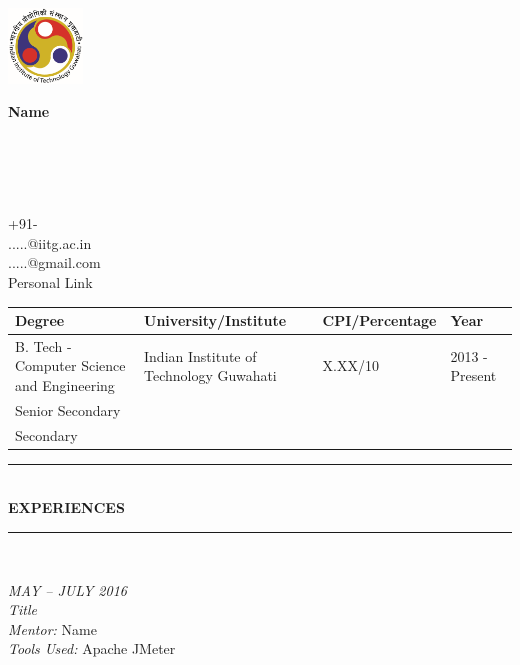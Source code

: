 \documentclass[a4paper,8pt]{article}
\newcommand{\resheading}[1]{

\begin{center}
\rule{\textwidth}{1pt}\vspace{-3pt}\\
	\textsc{{\textbf{#1}}}\vspace{-8pt}\\
\rule{\textwidth}{1pt}\\
\end{center}
\vspace{-5pt}
}
\begin{document}
\begin{minipage}{.1\textwidth}
\hspace*{-0.2in}
 \includegraphics[width=2cm,height=2cm]{iitglogo.png}
\end{minipage}
\begin{minipage}{.55\textwidth}

\textbf  {\large{Name}} \\
\\
\\
\\
\\
\end{minipage}
\hfill
\begin{minipage}{.30\textwidth}
\begin{flushright}
{+91-}\\
{.....@iitg.ac.in}\\
{.....@gmail.com} \\
{Personal Link}
\end{flushright}
\end{minipage}

\begin{center}
	\begin{tabular*}{\textwidth}{p{5cm}@{\hskip 0.2in} l@{\hskip 0.2in} l@{\hskip 0.2in} l@{\hskip 0.2in}}
		\hline
		\textbf{Degree} & \textbf{University/Institute} & \textbf{CPI/Percentage} & \textbf{Year}\vspace{0.5pt}\\
		\hline
		B. Tech - Computer Science and Engineering& Indian Institute of Technology Guwahati & X.XX/10 & 2013 - Present\\
		Senior Secondary &  &  & \\
		Secondary &  &  & \\
		
	\end{tabular*}
\end{center}

\resheading{\textbf{EXPERIENCES}}
  \hfill 
\textit{MAY – JULY 2016}\\
\noindent \textit{Title}\\
\noindent \textit{Mentor: } Name\\
\noindent \textit{Tools Used: } Apache JMeter
\end{document}
